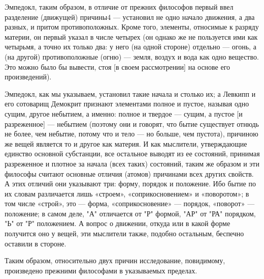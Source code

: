 \documentclass{article}
\begin{document}
Эмпедокл, таким образом, в отличие от прежних философов первый ввел разделение (движущей) причины4  — установил не одно начало движения, а два разных, и притом противоположных. Кроме того, элементы, относимые к разряду материи, он первый указал в числе четырех (он однако же не пользуется ими как четырьмя, а точно их только два: у него (на одной стороне) отдельно — огонь, а (на другой) противоположные (огню) — земля, воздух и вода как одно вещество. Это можно было бы вывести, стоя [в своем рассмотрении] на основе его произведений).

Эмпедокл, как мы указываем, установил такие начала и столько их; а Левкипп и его сотоварищ Демокрит признают элементами полное и пустое, называя одно сущим, другое небытием, а именно: полное и твердое — сущим, а пустое [и разреженное] — небытием (поэтому они и говорят, что бытие существует отнюдь не более, чем небытие, потому что и тело — но больше, чем пустота), причиною же вещей является то и другое как материя. И как мыслители, утверждающие единство основной субстанции, все остальное выводят из ее состояний, принимая разреженное и плотное за начала (всех таких) состояний, таким же образом и эти философы считают основные отличия (атомов) причинами всех других свойств. А этих отличий они указывают три: форму, порядок и положение. Ибо бытие по их словам различается лишь «строем», «соприкосновением» и «поворотом»; в том числе «строй», это — форма, «соприкосновение» — порядок, «поворот» — положение; в самом деле, "А" отличается от "Р" формой, "АР" от "РА" порядком, "Ь" от "Р" положением. А вопрос о движении, откуда или в какой форме получится оно у вещей, эти мыслители также, подобно остальным, беспечно оставили в стороне.

Таким образом, относительно двух причин исследование, повидимому, произведено прежними философами в указываемых пределах.
\end{document}
